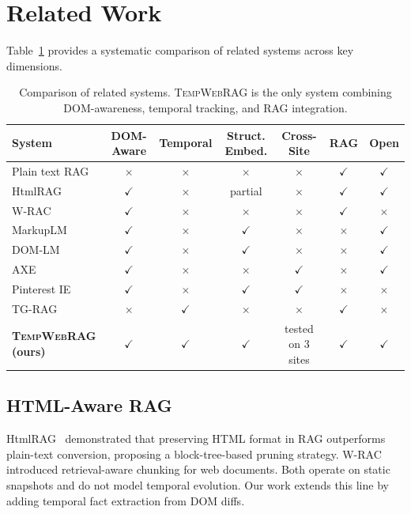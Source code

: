 \documentclass[11pt]{article}
\newcommand{\ours}{\textsc{TempWebRAG}}
\newcommand{\cmark}{$\checkmark$}
\newcommand{\xmark}{$\times$}
\begin{document}
\section{Related Work}
\label{sec:related}

Table~\ref{tab:comparison} provides a systematic comparison of related systems across key dimensions.

\begin{table}[t]
\centering
\caption{Comparison of related systems. \ours{} is the only system combining DOM-awareness, temporal tracking, and RAG integration.}
\label{tab:comparison}
\small
\begin{tabular}{lcccccc}
\toprule
\textbf{System} & \textbf{DOM-Aware} & \textbf{Temporal} & \textbf{Struct. Embed.} & \textbf{Cross-Site} & \textbf{RAG} & \textbf{Open} \\
\midrule
Plain text RAG & \xmark & \xmark & \xmark & \xmark & \cmark & \cmark \\
HtmlRAG~\cite{htmlrag2025} & \cmark & \xmark & partial & \xmark & \cmark & \cmark \\
W-RAC~\cite{wrac2025} & \cmark & \xmark & \xmark & \xmark & \cmark & \xmark \\
MarkupLM~\cite{markuplm2022} & \cmark & \xmark & \cmark & \xmark & \xmark & \cmark \\
DOM-LM~\cite{domlm2022} & \cmark & \xmark & \cmark & \xmark & \xmark & \cmark \\
AXE~\cite{axe2025} & \cmark & \xmark & \xmark & \cmark & \xmark & \cmark \\
Pinterest IE~\cite{pinterest2025} & \cmark & \xmark & \cmark & \cmark & \xmark & \xmark \\
TG-RAG~\cite{tgrag2025} & \xmark & \cmark & \xmark & \xmark & \cmark & \xmark \\
\textbf{\ours{} (ours)} & \cmark & \cmark & \cmark & tested on 3 sites & \cmark & \cmark \\
\bottomrule
\end{tabular}
\end{table}

\subsection{HTML-Aware RAG}

HtmlRAG~\cite{htmlrag2025} demonstrated that preserving HTML format in RAG outperforms plain-text conversion, proposing a block-tree-based pruning strategy. W-RAC~\cite{wrac2025} introduced retrieval-aware chunking for web documents. Both operate on static snapshots and do not model temporal evolution. Our work extends this line by adding temporal fact extraction from DOM diffs.
\end{document}
